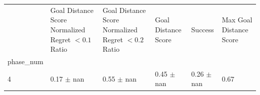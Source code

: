 \begin{tabular}{llllll}
\toprule
 & Goal Distance Score Normalized Regret $< 0.1$ Ratio & Goal Distance Score Normalized Regret $< 0.2$ Ratio & Goal Distance Score & Success & Max Goal Distance Score \\
phase_num &  &  &  &  &  \\
\midrule
4 & 0.17 $\pm$ nan & 0.55 $\pm$ nan & 0.45 $\pm$ nan & 0.26 $\pm$ nan & 0.67 \\
\bottomrule
\end{tabular}
